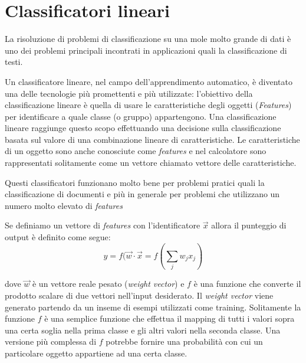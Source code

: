\documentclass[a4paper,12pt,openright,twoside]{report}
\theoremstyle{definition}
\begin{document}
\section{Classificatori lineari}
La risoluzione di problemi di classificazione su una mole molto grande di dati è uno dei problemi principali
incontrati in applicazioni quali la classificazione di testi.

Un classificatore lineare, nel campo dell'apprendimento automatico, è diventato una delle tecnologie più
promettenti e più utilizzate: l'obiettivo della 
classificazione lineare è quella di usare le caratteristiche degli oggetti (\emph{Features}) per identificare
a quale classe (o gruppo) appartengono. 
Una classificazione lineare raggiunge questo scopo effettuando una decisione sulla classificazione basata sul valore di una combinazione lineare di caratteristiche. 
Le caratteristiche di un oggetto sono anche conosciute come \emph{features} e nel calcolatore sono rappresentati solitamente come un vettore chiamato vettore delle caratteristiche.

Questi classificatori funzionano molto bene per problemi pratici quali la classificazione di 
documenti e più in generale per problemi che utilizzano un numero molto elevato di \emph{features}

Se definiamo un vettore di \emph{features} con l'identificatore $\vec{x}$ allora il punteggio di output
è definito come segue:
\begin{equation}
	y=f(\vec{w} \cdot \vec{x} = f (\sum_j w_jx_j)
	\label{output score}
\end{equation}

dove $\vec{w}$ è un vettore reale pesato (\emph{weight vector}) e $f$ è una 
funzione che converte il prodotto scalare di due vettori nell'input desiderato.
Il \emph{weight vector} viene generato partendo da un inseme di esempi utilizzati come training. Solitamente
la funzione $f$ è una semplice funzione
che effettua il mapping di tutti i valori sopra una certa soglia nella prima classe e gli altri valori nella
seconda classe. Una versione più complessa di $f$ potrebbe fornire una probabilità con cui un particolare
oggetto appartiene ad una certa classe.
\end{document}
